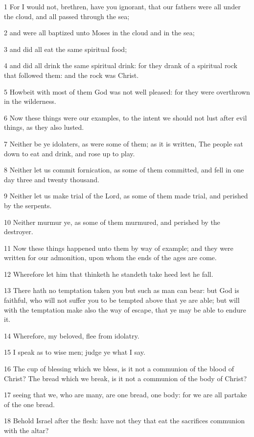 \par 1 For I would not, brethren, have you ignorant, that our fathers were all under the cloud, and all passed through the sea;
\par 2 and were all baptized unto Moses in the cloud and in the sea;
\par 3 and did all eat the same spiritual food;
\par 4 and did all drink the same spiritual drink: for they drank of a spiritual rock that followed them: and the rock was Christ.
\par 5 Howbeit with most of them God was not well pleased: for they were overthrown in the wilderness.
\par 6 Now these things were our examples, to the intent we should not lust after evil things, as they also lusted.
\par 7 Neither be ye idolaters, as were some of them; as it is written, The people sat down to eat and drink, and rose up to play.
\par 8 Neither let us commit fornication, as some of them committed, and fell in one day three and twenty thousand.
\par 9 Neither let us make trial of the Lord, as some of them made trial, and perished by the serpents.
\par 10 Neither murmur ye, as some of them murmured, and perished by the destroyer.
\par 11 Now these things happened unto them by way of example; and they were written for our admonition, upon whom the ends of the ages are come.
\par 12 Wherefore let him that thinketh he standeth take heed lest he fall.
\par 13 There hath no temptation taken you but such as man can bear: but God is faithful, who will not suffer you to be tempted above that ye are able; but will with the temptation make also the way of escape, that ye may be able to endure it.
\par 14 Wherefore, my beloved, flee from idolatry.
\par 15 I speak as to wise men; judge ye what I say.
\par 16 The cup of blessing which we bless, is it not a communion of the blood of Christ? The bread which we break, is it not a communion of the body of Christ?
\par 17 seeing that we, who are many, are one bread, one body: for we are all partake of the one bread.
\par 18 Behold Israel after the flesh: have not they that eat the sacrifices communion with the altar?
